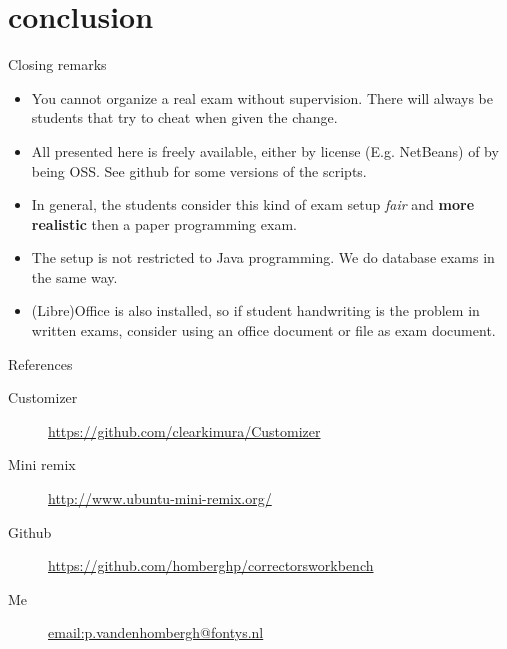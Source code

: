 \section{conclusion}
\begin{frame}{Closing remarks}
  \begin{itemize}
  \item You cannot organize a real exam without supervision. There
    will always be students that try to cheat when given the change.
  \item All presented here is freely available, either by license
    (E.g. NetBeans) of by being OSS. See github for some versions of
    the scripts.
  \item In general, the students consider this kind of exam setup \textit{fair}
    and \textbf{more realistic} then a paper programming exam.
  \item The setup is not restricted to Java programming. We do
    database exams in the same way.
  \item (Libre)Office is also installed, so if student handwriting is
    the problem in written exams, consider using an office document or
     file as exam document.
  \end{itemize}
\end{frame}
\begin{frame}{References}

  \begin{description}
  \item[Customizer] \url{https://github.com/clearkimura/Customizer}
    \item[Mini remix] \url{http://www.ubuntu-mini-remix.org/}
    \item[Github]
      \url{https://github.com/homberghp/correctorsworkbench}
    \item[Me] \url{email:p.vandenhombergh@fontys.nl}
  \end{description}
\end{frame}
